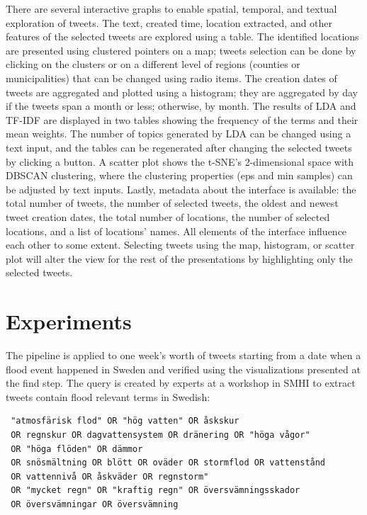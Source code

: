   There are several interactive graphs to enable spatial, temporal, and textual exploration of
  tweets. The text, created time, location extracted, and other features of the selected tweets are
  explored using a table. The identified locations are presented using clustered pointers on a map;
  tweets selection can be done by clicking on the clusters or on a different level of regions
  (counties or municipalities) that can be changed using radio items. The creation dates of tweets
  are aggregated and plotted using a histogram; they are aggregated by day if the tweets span a
  month or less; otherwise, by month. The results of \ac{LDA} and \ac{TF-IDF} are displayed in two
  tables showing the frequency of the terms and their mean weights. The number of topics generated
  by \ac{LDA} can be changed using a text input, and the tables can be regenerated after changing
  the selected tweets by clicking a button. A scatter plot shows the \ac{t-SNE}'s 2-dimensional
  space with \ac{DBSCAN}  clustering, where the clustering properties (eps and min samples) can be
  adjusted by text inputs. Lastly, metadata about the interface is available: the total number
  of tweets, the number of selected tweets, the oldest and newest tweet creation dates, the total
  number of locations, the number of selected locations, and a list of locations' names. All
  elements of the interface influence each other to some extent. Selecting tweets using the map,
  histogram, or scatter plot will alter the view for the rest of the presentations by highlighting
  only the selected tweets.

\section{Experiments}

The pipeline is applied to one week's worth of tweets starting from a date when a flood event happened
in Sweden and verified using the visualizations presented at the find step. The query is created by
experts at a workshop in \ac{SMHI} to extract tweets contain flood relevant terms in Swedish:

\begin{verbatim}
 "atmosfärisk flod" OR "hög vatten" OR åskskur
 OR regnskur OR dagvattensystem OR dränering OR "höga vågor"
 OR "höga flöden" OR dämmor
 OR snösmältning OR blött OR oväder OR stormflod OR vattenstånd
 OR vattennivå OR åskväder OR regnstorm"
 OR "mycket regn" OR "kraftig regn" OR översvämningsskador 
 OR översvämningar OR översvämning
\end{verbatim}

